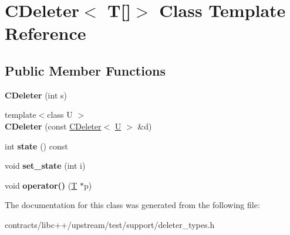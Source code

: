 \hypertarget{class_c_deleter_3_01_t[]_4}{}\section{C\+Deleter$<$ T\mbox{[}\mbox{]}$>$ Class Template Reference}
\label{class_c_deleter_3_01_t[]_4}
\subsection*{Public Member Functions}
\begin{DoxyCompactItemize}
\item 
\mbox{\label{class_c_deleter_3_01_t[]_4_ad725c8f9c601655a7913ca5d0dbae14f}} 
{\bfseries C\+Deleter} (int s)
\item 
\mbox{\label{class_c_deleter_3_01_t[]_4_aaf57c159778672916b9c822668be7326}} 
{\footnotesize template$<$class U $>$ }\\{\bfseries C\+Deleter} (const \mbox{\hyperlink{class_c_deleter}{C\+Deleter}}$<$ \mbox{\hyperlink{union_u}{U}} $>$ \&d)
\item 
\mbox{\label{class_c_deleter_3_01_t[]_4_ae2f9d5326014745a58aebdd0ba1a89f6}} 
int {\bfseries state} () const
\item 
\mbox{\label{class_c_deleter_3_01_t[]_4_ab04173b10a96d6d665abad1351ababd1}} 
void {\bfseries set\+\_\+state} (int i)
\item 
\mbox{\label{class_c_deleter_3_01_t[]_4_a2e533a5ab60576f9553ea417eab96543}} 
void {\bfseries operator()} (\mbox{\hyperlink{struct_t}{T}} $\ast$p)
\end{DoxyCompactItemize}


The documentation for this class was generated from the following file\+:\begin{DoxyCompactItemize}
\item 
contracts/libc++/upstream/test/support/deleter\+\_\+types.\+h\end{DoxyCompactItemize}
